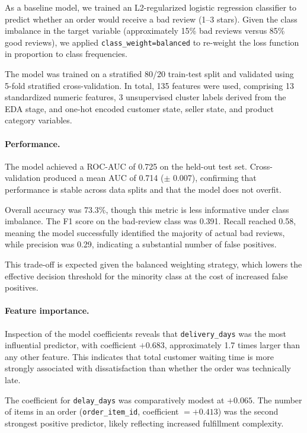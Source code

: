 \documentclass[11pt]{article}
\begin{document}
As a baseline model, we trained an L2-regularized logistic regression classifier to predict whether an order would receive a bad review (1--3 stars). Given the class imbalance in the target variable (approximately 15\% bad reviews versus 85\% good reviews), we applied \texttt{class\_weight=balanced} to re-weight the loss function in proportion to class frequencies.

The model was trained on a stratified 80/20 train-test split and validated using 5-fold stratified cross-validation. In total, 135 features were used, comprising 13 standardized numeric features, 3 unsupervised cluster labels derived from the EDA stage, and one-hot encoded customer state, seller state, and product category variables.

\paragraph{Performance.}

The model achieved a ROC-AUC of 0.725 on the held-out test set. Cross-validation produced a mean AUC of 0.714 ($\pm$ 0.007), confirming that performance is stable across data splits and that the model does not overfit.

Overall accuracy was 73.3\%, though this metric is less informative under class imbalance. The F1 score on the bad-review class was 0.391. Recall reached 0.58, meaning the model successfully identified the majority of actual bad reviews, while precision was 0.29, indicating a substantial number of false positives.

This trade-off is expected given the balanced weighting strategy, which lowers the effective decision threshold for the minority class at the cost of increased false positives.

\paragraph{Feature importance.}

Inspection of the model coefficients reveals that \texttt{delivery\_days} was the most influential predictor, with coefficient $+0.683$, approximately 1.7 times larger than any other feature. This indicates that total customer waiting time is more strongly associated with dissatisfaction than whether the order was technically late.

The coefficient for \texttt{delay\_days} was comparatively modest at $+0.065$. The number of items in an order (\texttt{order\_item\_id}, coefficient $= +0.413$) was the second strongest positive predictor, likely reflecting increased fulfillment complexity.
\end{document}

